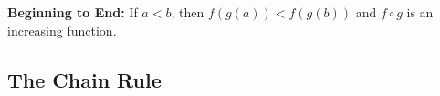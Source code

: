 \documentclass{ximera}
\begin{document}
\textbf{Beginning to End:} If $a < b$, then $f(g(a)) < f(g(b))$ and $f \circ g$ is an increasing function.
























































































\subsection*{The Chain Rule}
\end{document}
